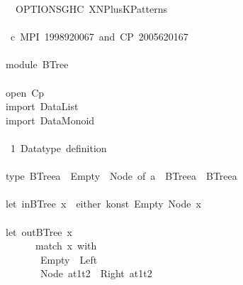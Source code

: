 \documentclass[a4paper]{article}
\begin{document}
\begin{tabbing}\ttfamily
~~~OPTIONSGHC~XNPlusKPatterns~\\
\ttfamily ~\\
\ttfamily ~~c~MPI~1998920067~and~CP~2005620167\\
\ttfamily ~\\
\ttfamily ~module~BTree~\\
\ttfamily ~\\
\ttfamily ~open~Cp\\
\ttfamily ~import~DataList\\
\ttfamily ~import~DataMonoid\\
\ttfamily ~\\
\ttfamily ~~1~Datatype~definition~\\
\ttfamily ~\\
\ttfamily ~type~BTreea~~Empty~~Node~of~a~~BTreea~~BTreea\\
\ttfamily ~\\
\ttfamily ~let~inBTree~x~~either~konst~Empty~Node~x\\
\ttfamily ~\\
\ttfamily ~let~outBTree~x~~\\
\ttfamily ~~~~~~~match~x~with\\
\ttfamily ~~~~~~~~Empty~~Left~\\
\ttfamily ~~~~~~~~Node~at1t2~~Right~at1t2\\

\end{tabbing}
\end{document}

